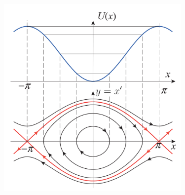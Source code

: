 \begin{ejer}
\begin{center}
		\includegraphics[width=9.5cm]{graphs/pendul-fase_1.png}
	\end{center}
\end{ejer}
